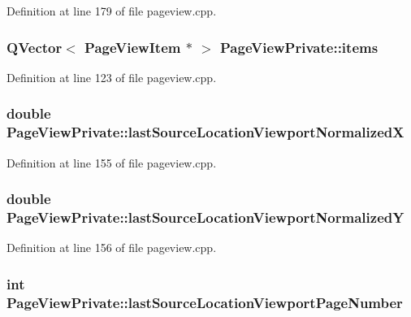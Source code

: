 Definition at line 179 of file pageview.\+cpp.

\hypertarget{classPageViewPrivate_ad90c795dead9abfaa5818a94e00435bc}{
\subsubsection[{items}]{\setlength{\rightskip}{0pt plus 5cm}Q\+Vector$<$ {\bf Page\+View\+Item} $\ast$ $>$ Page\+View\+Private\+::items}}\label{classPageViewPrivate_ad90c795dead9abfaa5818a94e00435bc}


Definition at line 123 of file pageview.\+cpp.

\hypertarget{classPageViewPrivate_ada1e593e53f5fe775184f97ec3b1bbc7}{
\subsubsection[{last\+Source\+Location\+Viewport\+Normalized\+X}]{\setlength{\rightskip}{0pt plus 5cm}double Page\+View\+Private\+::last\+Source\+Location\+Viewport\+Normalized\+X}}\label{classPageViewPrivate_ada1e593e53f5fe775184f97ec3b1bbc7}


Definition at line 155 of file pageview.\+cpp.

\hypertarget{classPageViewPrivate_af9fd59edb9afe621534cfb8086fc95ab}{
\subsubsection[{last\+Source\+Location\+Viewport\+Normalized\+Y}]{\setlength{\rightskip}{0pt plus 5cm}double Page\+View\+Private\+::last\+Source\+Location\+Viewport\+Normalized\+Y}}\label{classPageViewPrivate_af9fd59edb9afe621534cfb8086fc95ab}


Definition at line 156 of file pageview.\+cpp.

\hypertarget{classPageViewPrivate_a12f794c9556da941d62030f41e37ea87}{
\subsubsection[{last\+Source\+Location\+Viewport\+Page\+Number}]{\setlength{\rightskip}{0pt plus 5cm}int Page\+View\+Private\+::last\+Source\+Location\+Viewport\+Page\+Number}}\label{classPageViewPrivate_a12f794c9556da941d62030f41e37ea87}


